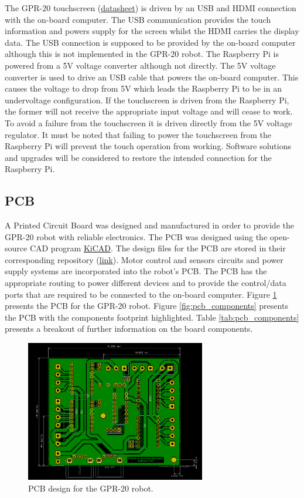 \documentclass{article}
\begin{document}
The GPR-20 touchscreen (\href{https://www.adafruit.com/product/2406}{datasheet}) is driven by an USB and HDMI connection with the on-board computer. The USB communication provides the touch information and powers supply for the screen whilst the HDMI carries the display data. The USB connection is supposed to be provided by the on-board computer although this is not implemented in the GPR-20 robot. The Raspberry Pi is powered from a 5V voltage converter although not directly. The 5V voltage converter is used to drive an USB cable that powers the on-board computer. This causes the voltage to drop from 5V which leads the Raspberry Pi to be in an undervoltage configuration. If the touchscreen is driven from the Raspberry Pi, the former will not receive the appropriate input voltage and will cease to work. To avoid a failure from the touchscreen it is driven directly from the 5V voltage regulator. It must be noted that failing to power the touchscreen from the Raspberry Pi will prevent the touch operation from working. Software solutions and upgrades will be considered to restore the intended connection for the Raspberry Pi.


\subsection{PCB}
A Printed Circuit Board was designed and manufactured in order to provide the GPR-20 robot with reliable electronics. The PCB was designed using the open-source CAD program \href{https://www.kicad.org/}{KiCAD}. The design files for the PCB are stored in their corresponding repository (\href{https://github.com/gdh-uniandes/gpr20_pcb}{link}). Motor control and sensors circuits and power supply systems are incorporated into the robot's PCB. The PCB has the appropriate routing to power different devices and to provide the control/data ports that are required to be connected to the on-board computer. Figure \ref{fig:pcb_diagram} presents the PCB for the GPR-20 robot. Figure \ref{fig:pcb_components} presents the PCB with the components footprint highlighted. Table \ref{tab:pcb_components} presents a breakout of further information on the board components.

\begin{figure}[h]
    \centering
    \includegraphics[width=0.7\textwidth]{images/electronics/pcb/dimensiones.png}
    \caption{PCB design for the GPR-20 robot.}
    \label{fig:pcb_diagram}
\end{figure}
\end{document}
